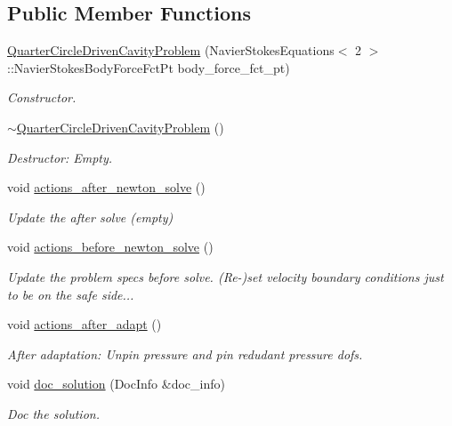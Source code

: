 \subsection*{Public Member Functions}
\begin{DoxyCompactItemize}
\item 
\hyperlink{classQuarterCircleDrivenCavityProblem_ae5fd69acf7d28a600cb6aa0bbb6a341c}{Quarter\+Circle\+Driven\+Cavity\+Problem} (Navier\+Stokes\+Equations$<$ 2 $>$\+::Navier\+Stokes\+Body\+Force\+Fct\+Pt body\+\_\+force\+\_\+fct\+\_\+pt)
\begin{DoxyCompactList}\small\item\em Constructor. \end{DoxyCompactList}\item 
\hyperlink{classQuarterCircleDrivenCavityProblem_a07410fd9d1194613f92dd6620fa3207a}{$\sim$\+Quarter\+Circle\+Driven\+Cavity\+Problem} ()
\begin{DoxyCompactList}\small\item\em Destructor\+: Empty. \end{DoxyCompactList}\item 
void \hyperlink{classQuarterCircleDrivenCavityProblem_ad2ed0b3e89e1cd0e28cc61ae4fd129bc}{actions\+\_\+after\+\_\+newton\+\_\+solve} ()
\begin{DoxyCompactList}\small\item\em Update the after solve (empty) \end{DoxyCompactList}\item 
void \hyperlink{classQuarterCircleDrivenCavityProblem_aa1d9cfd27fc1abe2a85e756009781547}{actions\+\_\+before\+\_\+newton\+\_\+solve} ()
\begin{DoxyCompactList}\small\item\em Update the problem specs before solve. (Re-\/)set velocity boundary conditions just to be on the safe side... \end{DoxyCompactList}\item 
void \hyperlink{classQuarterCircleDrivenCavityProblem_a4873f31ccf76e340abb284b17430c407}{actions\+\_\+after\+\_\+adapt} ()
\begin{DoxyCompactList}\small\item\em After adaptation\+: Unpin pressure and pin redudant pressure dofs. \end{DoxyCompactList}\item 
void \hyperlink{classQuarterCircleDrivenCavityProblem_a390b7b3c027a0253a2a3ac42f9715736}{doc\+\_\+solution} (Doc\+Info \&doc\+\_\+info)
\begin{DoxyCompactList}\small\item\em Doc the solution. \end{DoxyCompactList}\end{DoxyCompactItemize}
